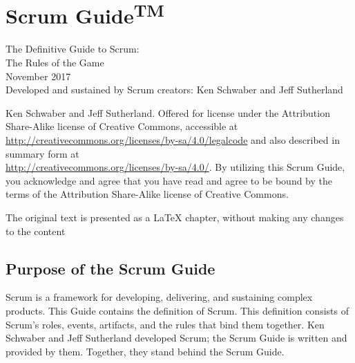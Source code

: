 \chapter{Scrum Guide\textsuperscript{TM}}
\label{sec:share000.scrumguide}

The Definitive Guide to Scrum:\\
The Rules of the Game\\
November 2017\\
Developed and sustained by Scrum creators: Ken Schwaber and Jeff Sutherland

 Ken Schwaber and Jeff Sutherland. Offered for license under the Attribution 
Share-Alike license of Creative Commons, accessible at \\
\url{http://creativecommons.org/licenses/by-sa/4.0/legalcode}
and also described in summary form at \\
\url{http://creativecommons.org/licenses/by-sa/4.0/}. By utilizing this Scrum Guide, you 
acknowledge and agree that you have read and agree to be bound by the terms of the Attribution 
Share-Alike license of Creative Commons. 

The original text is presented as a LaTeX chapter, without making any changes to the content

\section{Purpose of the Scrum Guide}
Scrum is a framework for developing, delivering, and sustaining complex products. This Guide
contains the definition of Scrum. This definition consists of Scrum's roles, events, artifacts, and
the rules that bind them together. Ken Schwaber and Jeff Sutherland developed Scrum; the
Scrum Guide is written and provided by them. Together, they stand behind the Scrum Guide.

